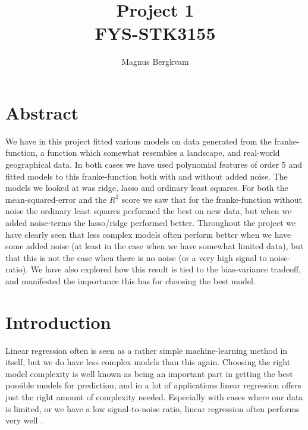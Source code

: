 \documentclass{article}
\author{Magnus Bergkvam}
\title{Project 1 \\ FYS-STK3155}
\begin{document}
\maketitle


\section{Abstract}
We have in this project fitted various models on data generated from the
franke-function, a function which somewhat resembles a landscape, and real-world
geographical data. In both cases we have used polynomial features of
order 5 and fitted models to this franke-function both with and without added
noise.  The models we looked at was ridge, lasso and ordinary least squares.
For both the mean-squared-error and the $R^2$ score we saw that for the
franke-function without noise the ordinary least squares performed the best on
new data, but when we added noise-terms the lasso/ridge performed better.
Throughout the project we have clearly seen that less complex models often
perform better when we have some added noise (at least in the case when we have
somewhat limited data), but that this is not the case when there is no noise (or
a very high signal to noise-ratio). We have also explored how this result is
tied to the bias-variance tradeoff, and manifested the importance this has for
choosing the best model.

\section{Introduction}
Linear regression often is seen as a rather simple machine-learning method in
itself, but we do have less complex models than this again. Choosing the right
model complexity is well known as being an important part in getting the best
possible models for prediction, and in a lot of applications linear regression
offers just the right amount of complexity needed. Especially with cases where
our data is limited, or we have a low signal-to-noise ratio, linear regression
often performs very well \cite[p.~43]{hastie2009elements}. \\
\end{document}
